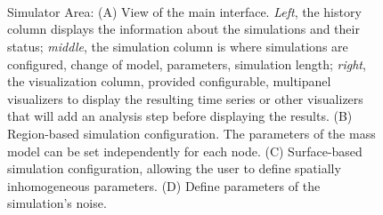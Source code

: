 		\begin{figure}[!htbp]

		\centering
			\\
			\\
			\\
			\caption{\TVB Simulator Area: 
                (A) View of the main interface. \textit{Left}, the history column displays the
                information about the simulations and their status; \textit{middle}, the
            simulation column is where simulations are configured,
            change of model, parameters, simulation length; \textit{right}, the
            visualization column, provided configurable, multipanel
            visualizers to display the resulting time series or other visualizers
            that will add an analysis step before displaying the results.  (B)
            Region-based simulation configuration. The parameters of the
            mass model can be set independently for each node.  (C) Surface-based
            simulation configuration, allowing the user to define spatially
            inhomogeneous parameters. (D) Define parameters of the simulation's noise. }
		\label{fig:simulator}
		\end{figure}

